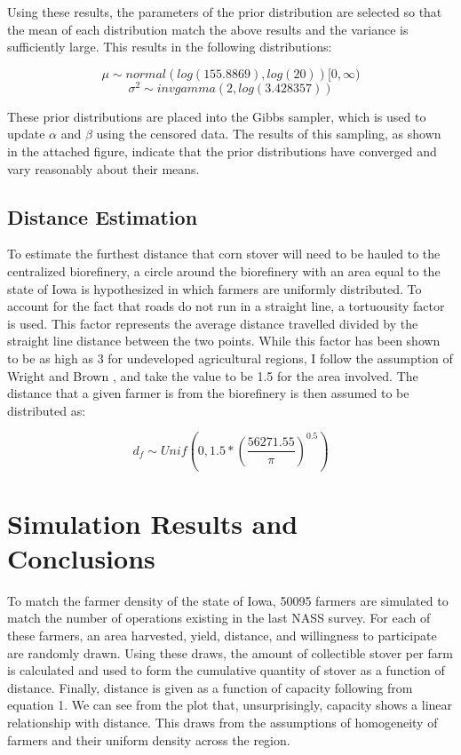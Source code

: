 \documentclass[12pt]{article}\usepackage[]{graphicx}\usepackage[]{color}
\begin{document}
Using these results, the parameters of the prior distribution are selected so that the mean of each distribution match the above results and the variance is sufficiently large.  This results in the following distributions:

\begin{equation}\tag{11}
\mu \sim normal(log(155.8869),log(20))[0,\infty)
\end{equation}
\begin{equation}\tag{12}
\sigma^2 \sim invgamma(2,log(3.428357))
\end{equation}

These prior distributions are placed into the Gibbs sampler, which is used to update $\alpha$ and $\beta$ using the censored data.  The results of this sampling, as shown in the attached figure, indicate that the prior distributions have converged and vary reasonably about their means.

\subsection{Distance Estimation}

To estimate the furthest distance that corn stover will need to be hauled to the centralized biorefinery, a circle around the biorefinery with an area equal to the state of Iowa is hypothesized in which farmers are uniformly distributed.  To account for the fact that roads do not run in a straight line, a tortuousity factor is used.  This factor represents the average distance travelled divided by the straight line distance between the two points.  While this factor has been shown to be as high as 3 for undeveloped agricultural regions, I follow the assumption of Wright and Brown \cite{Wright and Brown}, and take the value to be 1.5 for the area involved.  The distance that a given farmer is from the biorefinery is then assumed to be distributed as:

\begin{equation}\tag{13}
d_f \sim Unif(0,1.5*(\frac{56271.55}{\pi})^{0.5})
\end{equation}

\section{Simulation Results and Conclusions}

To match the farmer density of the state of Iowa, 50095 farmers are simulated to match the number of operations existing in the last NASS survey.  For each of these farmers, an area harvested, yield, distance, and willingness to participate are randomly drawn.  Using these draws, the amount of collectible stover per farm is calculated and used to form the cumulative quantity of stover as a function of distance.  Finally, distance is given as a function of capacity following from equation 1.  We can see from the plot that, unsurprisingly, capacity shows a linear relationship with distance.  This draws from the assumptions of homogeneity of farmers and their uniform density across the region.
\end{document}
